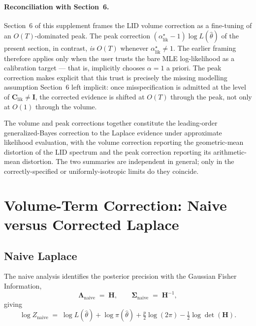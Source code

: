 \documentclass[11pt]{article}
\begin{document}
\paragraph{Reconciliation with Section~6.}
Section~6 of this supplement frames the LID volume correction as a fine-tuning of an $O(T)$-dominated peak. The peak correction $(\alpha^\star_{\mathrm{lik}}-1)\log L(\hat\theta)$ of the present section, in contrast, \emph{is} $O(T)$ whenever $\alpha^\star_{\mathrm{lik}} \neq 1$. The earlier framing therefore applies only when the user trusts the bare MLE log-likelihood as a calibration target --- that is, implicitly chooses $\alpha = 1$ a priori. The peak correction makes explicit that this trust is precisely the missing modelling assumption Section~6 left implicit: once misspecification is admitted at the level of $\mathbf C_{\mathrm{lik}} \neq \mathbf I$, the corrected evidence is shifted at $O(T)$ through the peak, not only at $O(1)$ through the volume.

The volume and peak corrections together constitute the leading-order generalized-Bayes correction to the Laplace evidence under approximate likelihood evaluation, with the volume correction reporting the geometric-mean distortion of the LID spectrum and the peak correction reporting its arithmetic-mean distortion. The two summaries are independent in general; only in the correctly-specified or uniformly-isotropic limits do they coincide.

\section{Volume-Term Correction: Naive versus Corrected Laplace}
\label{sec:naive-vs-corrected}

\subsection{Naive Laplace}

The naive analysis identifies the posterior precision with the Gaussian Fisher Information,
\begin{equation}
\boldsymbol\Lambda_{\mathrm{naive}}
\;=\;
\mathbf H,
\qquad
\boldsymbol\Sigma_{\mathrm{naive}}
\;=\;
\mathbf H^{-1},
\end{equation}
giving
\begin{equation}
\log Z_{\mathrm{naive}}
\;=\;
\log L(\hat\theta)
+ \log\pi(\hat\theta)
+ \tfrac{p}{2}\log(2\pi)
- \tfrac{1}{2}\log\det(\mathbf H).
\label{eq:naive-Z}
\end{equation}
\end{document}
